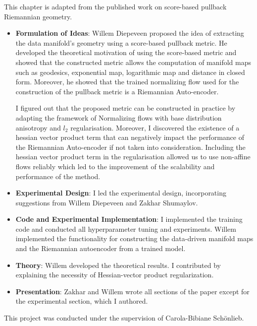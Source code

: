 This chapter is adapted from the published work on score-based pullback Riemannian geometry.

\begin{itemize}
\item \textbf{Formulation of Ideas}: Willem Diepeveen proposed the idea of extracting the data manifold's geometry using a score-based pullback metric. He developed the theoretical motivation of using the score-based metric and showed that the constructed metric allows the computation of manifold maps such as geodesics, exponential map, logarithmic map and distance in closed form. Moreover, he showed that the trained normalizing flow used for the construction of the pullback metric is a Riemannian Auto-encoder.

I figured out that the proposed metric can be constructed in practice by adapting the framework of Normalizing flows with base distribution anisotropy and $l_2$ regularisation. Moreover, I discovered the existence of a hessian vector product term that can negatively impact the performance of the Riemannian Auto-encoder if not taken into consideration. 
Including the hessian vector product term in the regularisation allowed us to use non-affine flows reliably which led to the improvement of the scalability and performance of the method.

\item \textbf{Experimental Design}: I led the experimental design, incorporating suggestions from Willem Diepeveen and Zakhar Shumaylov.
\item \textbf{Code and Experimental Implementation}: I implemented the training code and conducted all hyperparameter tuning and experiments. Willem implemented the functionality for constructing the data-driven manifold maps and the Riemannian autoencoder from a trained model.
\item \textbf{Theory}: Willem developed the theoretical results. I contributed by explaining the necessity of Hessian-vector product regularization.
\item \textbf{Presentation}: Zakhar and Willem wrote all sections of the paper except for the experimental section, which I authored.
\end{itemize}

This project was conducted under the supervision of Carola-Bibiane Sch\"onlieb.